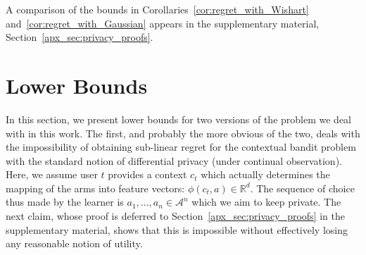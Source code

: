 \documentclass{article}
\newcommand{\Real}{\mathds{R}}
\renewcommand{\Pr}{\mathds{P}}
\newcommand{\A}{\mathcal{A}}
\begin{document}
A comparison of the bounds in Corollaries~\ref{cor:regret_with_Wishart} and~\ref{cor:regret_with_Gaussian} appears in the supplementary material, Section~\ref{apx_sec:privacy_proofs}.

\section{Lower Bounds}
\label{sec:lower_bounds}

In this section, we present lower bounds for two versions of the
problem we deal with in this work. The first, and probably the more
obvious of the two, deals with the impossibility of obtaining
sub-linear regret for the contextual bandit problem with the standard
notion of differential privacy (under continual observation). Here, we
assume user $t$ provides a context $c_t$ which actually determines the
mapping of the arms into feature vectors: $\phi(c_t, a) \in
\Real^d$. The sequence of choice thus made by the learner is
$a_1,..., a_n \in \A^n$ which we aim to keep private. The next
claim, whose proof is deferred to Section~\ref{apx_sec:privacy_proofs}
in the supplementary material, shows that this is impossible without
effectively losing any reasonable notion of utility.
\DeclareRobustCommand{\DPDefinition} {Formally, two sequences
  $S = \langle (c_1, y_1),..., (c_n,y_n)\rangle$ and
  $S' = \langle (c'_1, y'_1),..., (c'_n,y'_n)\rangle$ are called
  neighbors if there exists a single $t$ such that for any $t'\neq t$
  we have $(c_{t'},y_{t'}) = (c'_{t'},y'_{t'})$); and an algorithm $A$
  is $(\varepsilon,\delta)$-differentially private if for any two
  neigboring sequences $S$ and $S'$ and any subsets of sequences of
  actions ${\cal S}\subset \A^n$ it holds that
  $\Pr[A(S)\in\mathcal{S}] \leq e^\varepsilon \Pr[A(S')\in
  \mathcal{S}] +\delta$.}
\end{document}
